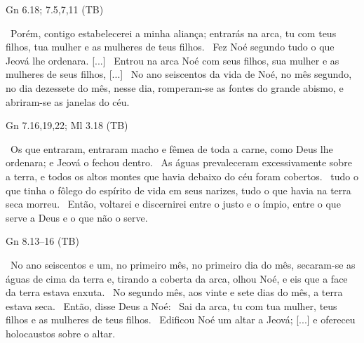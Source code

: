 \documentclass[12pt,aspectratio=169]{beamer}
\newcommand{\ver}[1]{%
    \raisebox{0.50ex}{%
        \scalebox{1.1}{%
            \pmb{\textbf{\textcolor{BSpbg}{#1}}}%
        }%
    }%
}
\newcommand{\QUOTE}[1]{%
    \par\noindent\hspace*{0.05\linewidth}%
    \begin{minipage}{0.9\linewidth}%
        \linespread{1.35}\large{#1}%
    \end{minipage}%
}
\newcommand{\RED}[1]{{\textcolor{TXred}{#1}}}
\newcommand{\ORA}[1]{{\textcolor{TXred!50!TXyel}{#1}}}
\newcommand{\YEL}[1]{{\textcolor{TXyel}{#1}}}
\newcommand{\GRE}[1]{{\textcolor{TXgre}{#1}}}
\begin{document}
    \begin{frame}{Gn 6.18; 7.5,7,11 (TB)}
        \QUOTE{%
            \ver{6.18}~Porém, \YEL{contigo estabelecerei a minha aliança}; entrarás na arca,
            \GRE{tu} com \GRE{teus filhos}, \GRE{tua mulher} e as \GRE{mulheres de teus filhos}.
            \ver{7.5}~Fez Noé segundo tudo o que Jeová lhe ordenara. [...]
            \ver{7.7}~Entrou na arca Noé com seus filhos, sua mulher e as mulheres de seus
            filhos, [...]
            \ver{7.11}~No \YEL{ano} seiscentos da vida de Noé, no \YEL{mês} segundo, no
            \YEL{dia} dezessete do mês, \YEL{nesse dia}, romperam-se as fontes do grande abismo,
            e abriram-se as janelas do céu.
        }
    \end{frame}

    \begin{frame}{Gn 7.16,19,22; Ml 3.18 (TB)}
        \QUOTE{%
            \ver{Gn 7.16}~Os que entraram, entraram macho e fêmea de toda a carne, como Deus lhe
            ordenara; \YEL{e Jeová o fechou dentro}.
            \ver{7.19}~As águas prevaleceram excessivamente sobre a terra, e \YEL{todos} os
            altos \YEL{montes} que havia debaixo do céu foram \YEL{cobertos}.
            \ver{7.22}~\YEL{tudo} o que tinha o \GRE{fôlego do espírito de vida em seus
            narizes}, tudo o que havia na terra seca \RED{morreu}.
            \ver{Ml 3.18}~Então, \YEL{voltarei} e \YEL{discernirei} entre o \GRE{justo} e o
            \RED{ímpio}, entre o que serve a Deus e o que não o serve.
        }
    \end{frame}

    \begin{frame}{Gn 8.13--16 (TB)}
        \QUOTE{%
            \ver{13}~No \YEL{ano} seiscentos e um, no primeiro \YEL{mês}, no primeiro \YEL{dia}
            do mês, secaram-se as águas de cima da terra e, tirando a coberta da arca, olhou
            Noé, e eis que a face da terra estava enxuta.
            \ver{14}~No segundo mês, aos vinte e sete dias do mês, a terra estava \YEL{seca}.
            \ver{15}~Então, disse Deus a Noé:
            \ver{16}~\GRE{Sai da arca, tu com tua mulher, teus filhos e as mulheres de teus
            filhos}.
            \ver{20}~Edificou Noé um altar a Jeová; [...] e \ORA{ofereceu holocaustos} sobre o
            altar.
        }
    \end{frame}
\end{document}
